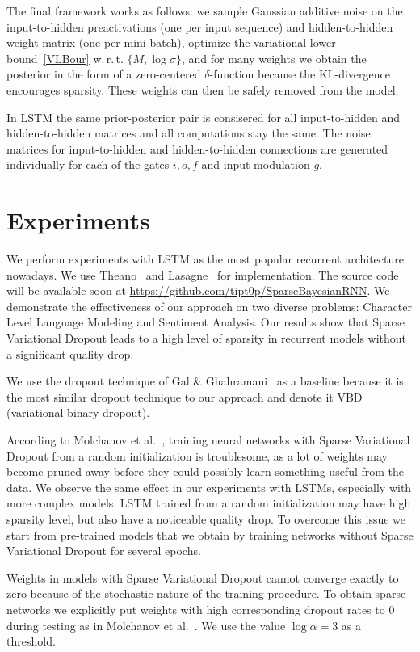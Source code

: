 \documentclass{article}
\begin{document}
The final framework works as follows: we sample Gaussian additive noise on the input-to-hidden preactivations (one per input sequence) and hidden-to-hidden weight matrix (one per mini-batch), optimize the variational lower bound~\eqref{VLBour} w.\,r.\,t. 
$\{M, \log \sigma\}$, and for many weights we obtain the posterior in the form of a zero-centered $\delta$-function because the KL-divergence encourages sparsity. These weights can then be safely removed from the model.

In LSTM the same prior-posterior pair is consisered for all input-to-hidden and hidden-to-hidden matrices and all computations stay the same. The noise matrices for input-to-hidden and hidden-to-hidden connections are generated individually for each of the gates $i,o,f$ and input modulation $g$.

\section{Experiments}

We perform experiments with LSTM as the most popular recurrent architecture nowadays. We use Theano~\cite{theano} and Lasagne~\cite{lasagne} for implementation. The source code will be available soon at \url{https://github.com/tipt0p/SparseBayesianRNN}.  We demonstrate the effectiveness of our approach on two diverse problems: Character Level Language Modeling and Sentiment Analysis. Our results show that Sparse Variational Dropout leads to a high level of sparsity in recurrent models without a significant quality drop. 

We use the dropout technique of Gal \& Ghahramani~ as a baseline because it is the most similar dropout technique to our approach and denote it VBD (variational binary dropout). 

According to Molchanov et al.~, training neural networks with Sparse Variational Dropout from a random initialization is troublesome, as a lot of weights may become pruned away before they could possibly learn something useful from the data. We observe the same effect in our experiments with LSTMs, especially with more complex models. LSTM trained from a random initialization may have high sparsity level, but also have a noticeable quality drop. To overcome this issue we start from pre-trained models that we obtain by training networks without Sparse Variational Dropout for several epochs. 

Weights in models with Sparse Variational Dropout cannot converge exactly to zero because of the stochastic nature of the training procedure. To obtain sparse networks we explicitly put weights with high corresponding dropout rates to 0 during testing as in Molchanov et al.~. We use the value $\log\alpha = 3$ as a threshold. 
\end{document}
